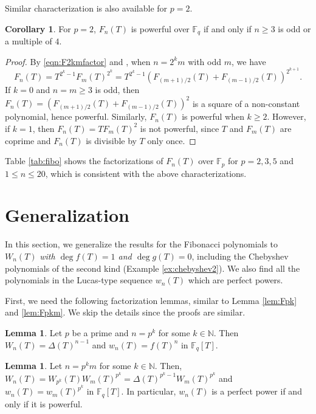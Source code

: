 \documentclass[letterpaper, 10pt]{article}
\newcommand{\bF}{\mathbb{F}}
\newcommand{\1}{\mathds{1}}	%
\theoremstyle{definition}
\newtheorem{lemma}[theorem]{Lemma}
\newtheorem{corollary}[theorem]{Corollary}
\theoremstyle{remark}
\begin{document}
Similar characterization is also available for $p = 2$.
\begin{corollary}
\label{cor:powerfulp2}
    For $p = 2$, $F_n(T)$ is powerful over $\bF_q$ if and only if $n \ge 3$ is odd or a multiple of $4$.
\end{corollary}
\begin{proof}
    By \eqref{eqn:F2kmfactor} and \cite[Lemma 3.5]{kitayama2017irreducibility}, when $n = 2^k m$ with odd $m$, we have 
    \[F_n(T) = T^{2^k - 1}F_{m}(T)^{2^k} = T^{2^k - 1}(F_{(m+1)/2}(T)  + F_{(m-1)/2}(T))^{2^{k+1}}.\]
    If $k = 0$ and $n = m \ge 3$ is odd, then $F_n(T) = (F_{(m+1)/2}(T)  + F_{(m-1)/2}(T))^{2}$ is a square of a non-constant polynomial, hence powerful.
    Similarly, $F_n(T)$ is powerful when $k \ge 2$.
    However, if $k = 1$, then $F_n(T) = TF_m(T)^2$ is not powerful, since $T$ and $F_m(T)$ are coprime and $F_n(T)$ is divisible by $T$ only once.
\end{proof}

Table \ref{tab:fibo} shows the factorizations of $F_n(T)$ over $\bF_p$ for $p = 2, 3, 5$ and $1 \le n \le 20$, which is consistent with the above characterizations.
\section{Generalization}

In this section, we generalize the results for the Fibonacci polynomials to $W_n(T)$ \emph{with $\deg f(T) = 1$ and $\deg g(T) = 0$}, including the Chebyshev polynomials of the second kind (Example \ref{ex:chebyshev2}). We also find all the polynomials in the Lucas-type sequence $w_n(T)$ which are perfect powers. 

First, we need the following factorization lemmas, similar to Lemma \ref{lem:Fpk} and \ref{lem:Fpkm}.
We skip the details since the proofs are similar.

\begin{lemma}
\label{lem:Wwpk}
    Let $p$ be a prime and $n = p^k$ for some $k \in \mathbb{N}$. Then $W_n(T) = \Delta(T)^{n-1}$ and $w_n(T) = f(T)^n$ in $\bF_q[T]$.
\end{lemma}


\begin{lemma}
\label{lem:Wwpkm}
    Let $n = p^km$ for some $k \in \mathbb{N}$. Then, $W_n(T) = W_{p^k}(T) W_{m} (T)^{p^k} = \Delta(T)^{p^k - 1} W_{m}(T)^{p^k}$ and $w_n(T) = w_m(T)^{p^k}$ in $\mathbb{F}_q[T]$.
    In particular, $w_n(T)$ is a perfect power if and only if it is powerful.
\end{lemma}
\end{document}
